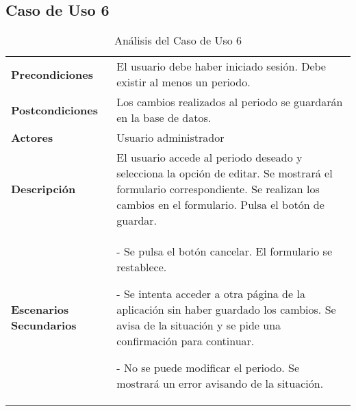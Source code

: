 \subsection{Caso de Uso 6}
\begin{table}[H]
  \centering
  \vspace{-5mm}
  \caption{Análisis del Caso de Uso 6}
    \begin{tabular}{p{7.5em}p{24.145em}}
    \toprule
    \rowcolor[rgb]{ .871,  .918,  .965} \multicolumn{2}{p{31.645em}}{\textbf{Modificar periodo}} \\
    \midrule
    \rowcolor[rgb]{ .906,  .902,  .902} \textbf{Precondiciones} & \cellcolor[rgb]{ 1,  1,  1}El usuario debe haber iniciado sesión. Debe existir al menos un periodo. \\
    \midrule
    \rowcolor[rgb]{ .906,  .902,  .902} \textbf{Postcondiciones} & \cellcolor[rgb]{ 1,  1,  1}Los cambios realizados al periodo se guardarán en la base de datos. \\
    \midrule
    \rowcolor[rgb]{ .906,  .902,  .902} \textbf{Actores} & \cellcolor[rgb]{ 1,  1,  1}Usuario administrador \\
    \midrule
    \rowcolor[rgb]{ .906,  .902,  .902} \textbf{Descripción} & \cellcolor[rgb]{ 1,  1,  1}El usuario accede al periodo deseado y selecciona la opción de editar. Se mostrará el formulario correspondiente. Se realizan los cambios en el formulario. Pulsa el botón de guardar. \\
    \midrule
    \rowcolor[rgb]{ .906,  .902,  .902} \textbf{Escenarios          Secundarios} & \cellcolor[rgb]{ 1,  1,  1}- Se pulsa el botón cancelar. El formulario se restablece.\par - Se intenta acceder a otra página de la aplicación sin haber guardado los cambios. Se avisa de la situación y se pide una confirmación para continuar.\par - No se puede modificar el periodo. Se mostrará un error avisando de la situación. \\
    \bottomrule
    \end{tabular}%
\end{table}%
 
